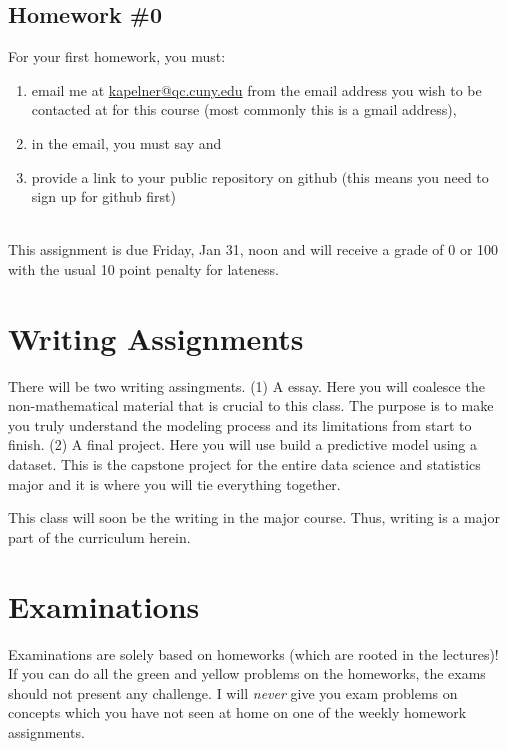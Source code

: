 \documentclass[12pt]{article}
\begin{document}
\subsection*{Homework \#0}

For your first homework, you must:

\begin{enumerate}[(1)]
\item email me at \href{kapelner@qc.cuny.edu}{kapelner@qc.cuny.edu} from the email address you wish to be contacted at for this course (most commonly this is a gmail address),
\item in the email, you must say  and
\item provide a link to your public repository on github (this means you need to sign up for github first)
\end{enumerate}

\noindent {} \\

This assignment is due Friday, Jan 31, noon and will receive a grade of 0 or 100 with the usual 10 point penalty for lateness.

\section*{Writing Assignments}

There will be two writing assingments. (1) A  essay. Here you will coalesce the non-mathematical material that is crucial to this class. The purpose is to make you truly understand the modeling process and its limitations from start to finish. (2) A final project. Here you will use build a predictive model using a dataset. This is the capstone project for the entire data science and statistics major and it is where you will tie everything together.

This class will soon be the writing in the major course. Thus, writing is a major part of the curriculum herein.

\section*{Examinations}

Examinations are solely based on homeworks (which are rooted in the lectures)! If you can do all the green and yellow problems on the homeworks, the exams should not present any challenge. I will \textit{never} give you exam problems on concepts which you have not seen at home on one of the weekly homework assignments. 
\end{document}
